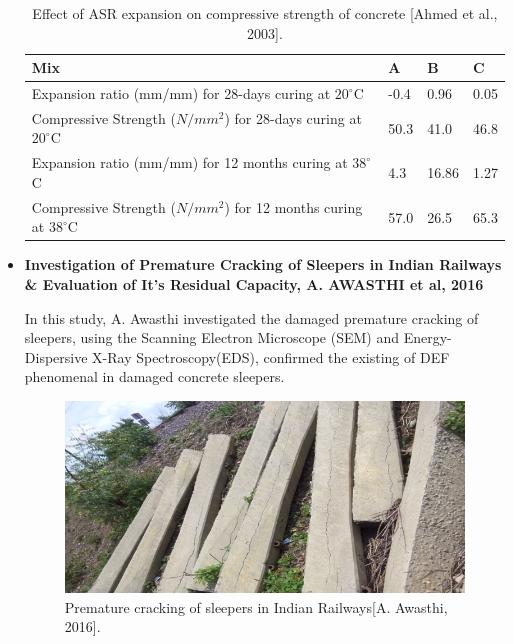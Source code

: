 \begin{itemize}
    \begin{table}[ht!]
        \centering
            \begin{tabular}{ |p{6cm}|p{1.5cm}|p{1.5cm}|p{1.5cm}| }
             \hline
             Mix &  A & B & C  \\ [0.5ex]
             \hline
             Expansion ratio (mm/mm) for 28-days curing at $20^\circ$C & -0.4 & 0.96 & 0.05 \\
             \hline
             Compressive Strength ($N/mm^2$) for 28-days curing at $20^\circ$C & 50.3 & 41.0 & 46.8 \\
             \hline
             Expansion ratio (mm/mm) for 12 months curing at $38^\circ$C & 4.3 & 16.86 & 1.27 \\
             \hline
             Compressive Strength ($N/mm^2$) for 12 months curing at $38^\circ$C & 57.0 & 26.5 & 65.3 \\ [0.5ex]
             \hline
            \end{tabular}
        \caption{Effect of ASR expansion on compressive strength of concrete [Ahmed et al., 2003].}
        \label{table:Ahmed et al.}
    \end{table}


    \item
    \textbf{Investigation of Premature Cracking of Sleepers in Indian Railways \& Evaluation of It's Residual Capacity, A. AWASTHI et al, 2016}

      In this study, A. Awasthi\cite{Awasthi} investigated the damaged premature cracking of sleepers, using the Scanning Electron Microscope (SEM) and Energy-Dispersive X-Ray Spectroscopy(EDS), confirmed the existing of DEF phenomenal in damaged concrete sleepers.

      \begin{figure}[ht!]
          \centering
          \includegraphics[width=.8\linewidth]{Files/Background/Anupam_3.png}
          \caption{Premature cracking of sleepers in Indian Railways[A. Awasthi, 2016].}
          \label{fig:Awasthi_3}
      \end{figure}


\end{itemize}

